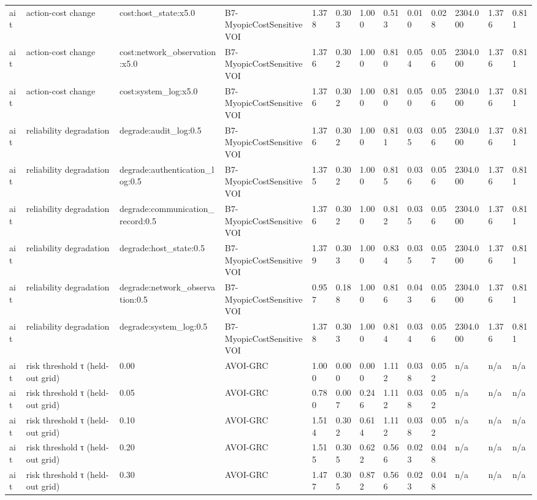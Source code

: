 \begin{table}[!ht]
{\begin{tabular}{lllllllllllll}
ait & action-cost change & cost:host\_state:x5.0 & B7-MyopicCostSensitiveVOI & 1.378 & 0.303 & 1.000 & 0.513 & 0.010 & 0.028 & 2304.000 & 1.376 & 0.811 \\
ait & action-cost change & cost:network\_observation:x5.0 & B7-MyopicCostSensitiveVOI & 1.376 & 0.302 & 1.000 & 0.810 & 0.054 & 0.056 & 2304.000 & 1.376 & 0.811 \\
ait & action-cost change & cost:system\_log:x5.0 & B7-MyopicCostSensitiveVOI & 1.376 & 0.302 & 1.000 & 0.810 & 0.050 & 0.056 & 2304.000 & 1.376 & 0.811 \\
ait & reliability degradation & degrade:audit\_log:0.5 & B7-MyopicCostSensitiveVOI & 1.376 & 0.302 & 1.000 & 0.811 & 0.035 & 0.056 & 2304.000 & 1.376 & 0.811 \\
ait & reliability degradation & degrade:authentication\_log:0.5 & B7-MyopicCostSensitiveVOI & 1.375 & 0.302 & 1.000 & 0.815 & 0.036 & 0.056 & 2304.000 & 1.376 & 0.811 \\
ait & reliability degradation & degrade:communication\_record:0.5 & B7-MyopicCostSensitiveVOI & 1.376 & 0.302 & 1.000 & 0.812 & 0.035 & 0.056 & 2304.000 & 1.376 & 0.811 \\
ait & reliability degradation & degrade:host\_state:0.5 & B7-MyopicCostSensitiveVOI & 1.379 & 0.303 & 1.000 & 0.834 & 0.035 & 0.057 & 2304.000 & 1.376 & 0.811 \\
ait & reliability degradation & degrade:network\_observation:0.5 & B7-MyopicCostSensitiveVOI & 0.957 & 0.188 & 1.000 & 0.816 & 0.043 & 0.056 & 2304.000 & 1.376 & 0.811 \\
ait & reliability degradation & degrade:system\_log:0.5 & B7-MyopicCostSensitiveVOI & 1.378 & 0.303 & 1.000 & 0.814 & 0.034 & 0.056 & 2304.000 & 1.376 & 0.811 \\
ait & risk threshold τ (held-out grid) & 0.00 & AVOI-GRC & 1.000 & 0.000 & 0.000 & 1.112 & 0.038 & 0.052 & n/a & n/a & n/a \\
ait & risk threshold τ (held-out grid) & 0.05 & AVOI-GRC & 0.780 & 0.007 & 0.246 & 1.112 & 0.038 & 0.052 & n/a & n/a & n/a \\
ait & risk threshold τ (held-out grid) & 0.10 & AVOI-GRC & 1.514 & 0.302 & 0.614 & 1.112 & 0.038 & 0.052 & n/a & n/a & n/a \\
ait & risk threshold τ (held-out grid) & 0.20 & AVOI-GRC & 1.515 & 0.305 & 0.622 & 0.566 & 0.023 & 0.048 & n/a & n/a & n/a \\
ait & risk threshold τ (held-out grid) & 0.30 & AVOI-GRC & 1.477 & 0.305 & 0.872 & 0.566 & 0.023 & 0.048 & n/a & n/a & n/a \\

\end{tabular}}
\end{table}
